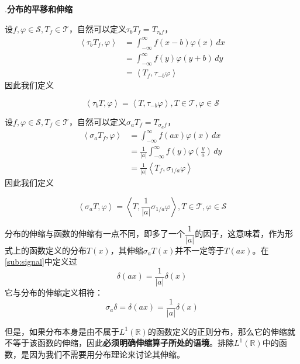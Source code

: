 .\textbf{分布的平移和伸缩}

设$f,\varphi\in\mathcal{S} ,T_f\in\mathcal{T} $，自然可以定义$\tau_b T_f=T_{\tau_b f}$，
\begin{align*}
    \left\langle \tau_b T_f,\varphi\right\rangle & =\int_{-\infty}^{\infty}f(x-b)\varphi(x)\,dx \\
                                      & =\int_{-\infty}^{\infty}f(y)\varphi(y+b)\,dy \\
                                      & =\left\langle T_f,\tau_{-b}\varphi\right\rangle
\end{align*}
因此我们定义\begin{definition}[分布的平移]
    \begin{equation*}
    \left\langle \tau_b T,\varphi\right\rangle=\left\langle T,\tau_{-b}\varphi\right\rangle,T\in\mathcal{T} ,\varphi\in\mathcal{S}
\end{equation*}
\end{definition}

设$f,\varphi\in\mathcal{S} ,T_f\in\mathcal{T} $，自然可以定义$\sigma_a T_f=T_{\sigma_a f}$，
\begin{align*}
    \left\langle \sigma_a T_f,\varphi\right\rangle & =\int_{-\infty}^{\infty}f(ax)\varphi(x)\,dx                                  \\
                                        & =\frac{1}{|a|}\int_{-\infty}^{\infty}f(y)\varphi\left(\frac{y}{a}\right)\,dy \\
                                        & =\frac{1}{|a|}\left\langle T_f,\sigma_{1/a}\varphi\right\rangle
\end{align*}
因此我们定义\begin{definition}[分布的伸缩]
    \begin{equation*}
    \left\langle\sigma_a T,\varphi\right\rangle=\left\langle T,\frac{1}{|a|}\sigma_{1/a}\varphi\right\rangle,T\in\mathcal{T} ,\varphi\in\mathcal{S}
\end{equation*}
\end{definition}

分布的伸缩与函数的伸缩有一点不同，即多了一个$\dfrac{1}{|a|}$的因子，这意味着，作为形式上的函数定义的分布$T(x)$，其伸缩$\sigma_a T(x)$并不一定等于$T(ax)$。在\ref{sub:signal}中定义过
$$\delta(ax)=\dfrac{1}{|a|}\delta(x)$$
它与分布的伸缩定义相符：
$$\sigma_a\delta=\delta(ax)=\frac{1}{|a|}\delta(x)$$

但是，如果分布本身是由不属于$L^1(\mathbb{R})$的函数定义的正则分布，那么它的伸缩就不等于该函数的伸缩，因此\textbf{必须明确伸缩算子所处的语境}。排除$L^1(\mathbb{R})$中的函数，是因为我们不需要用分布理论来讨论其伸缩。


